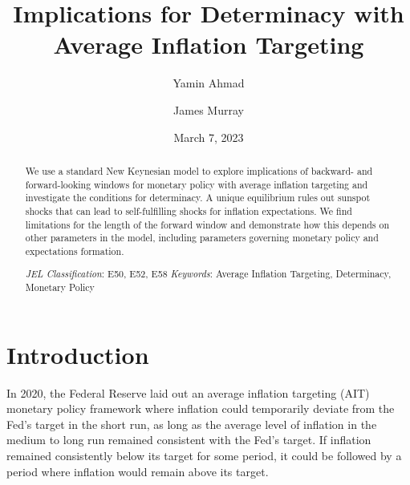 \documentclass[english,authoryear,12pt]{elsarticle}
\begin{document}
	\begin{frontmatter}
		\title{Implications for Determinacy with Average Inflation Targeting}
		\date{March 7, 2023}

		\author[1]{Yamin Ahmad }
		\author[2]{James Murray}

		\address[1]{Dept. of Economics, University of Wisconsin - Whitewater, 809 W. Starin Road, Whitewater, WI 53190, USA}
		\address[2]{Dept. of Economics, University of Wisconsin - La Crosse, 1725 State St., La Crosse, WI 54601, USA}

	\begin{abstract}
		We use a standard New Keynesian model to explore implications of backward- and forward-looking windows for monetary policy with average inflation targeting and investigate the conditions for determinacy. A unique equilibrium rules out sunspot shocks that can lead to self-fulfilling shocks for inflation expectations. We find limitations for the length of the forward window and demonstrate how this depends on other parameters in the model, including parameters governing monetary policy and expectations formation.

		\begin{flushleft}
			{\it JEL Classification}: E50, E52, E58 \newline
			{\it Keywords}: Average Inflation Targeting, Determinacy, Monetary Policy
		\end{flushleft}
	\end{abstract}

\end{frontmatter}

\renewcommand{\thefootnote}{\arabic{footnote}}%
\setcounter{page}{1}%
\setcounter{footnote}{0}%


\section{\label{Intro}Introduction}
In 2020, the Federal Reserve laid out an average inflation targeting (AIT) monetary policy framework where inflation could temporarily deviate from the Fed's target in the short run, as long as the average level of inflation in the medium to long run remained consistent with the Fed's target. If inflation remained consistently below its target for some period, it could be followed by a period where inflation would remain above its target.
\end{document}

